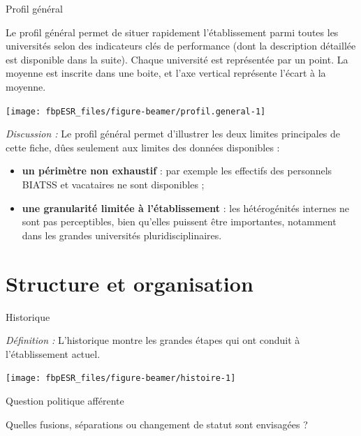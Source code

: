 \documentclass[
  8pt,
  french,
  ignorenonframetext,
  landscape]{beamer}
\providecommand{\tightlist}{%
  \setlength{\itemsep}{0pt}\setlength{\parskip}{0pt}}
\begin{document}
\begin{frame}{Profil général}
\protect\hypertarget{profil-guxe9nuxe9ral}{}

Le profil général permet de situer rapidement l'établissement parmi
toutes les universités selon des indicateurs clés de performance (dont
la description détaillée est disponible dans la suite). Chaque
université est représentée par un point. La moyenne est inscrite dans
une boite, et l'axe vertical représente l'écart à la moyenne.

\begin{center}\texttt{[image: fbpESR\_files/figure-beamer/profil.general-1]} \end{center}

\emph{Discussion :} Le profil général permet d'illustrer les deux
limites principales de cette fiche, dûes seulement aux limites des
données disponibles :

\begin{itemize}
\tightlist
\item
  \textbf{un périmètre non exhaustif} : par exemple les effectifs des
  personnels BIATSS et vacataires ne sont disponibles ;
\item
  \textbf{une granularité limitée à l'établissement} : les hétérogénités
  internes ne sont pas perceptibles, bien qu'elles puissent être
  importantes, notamment dans les grandes universités
  pluridisciplinaires.
\end{itemize}

\end{frame}

\hypertarget{structure-et-organisation}{%
\section{Structure et organisation}\label{structure-et-organisation}}

\begin{frame}{Historique}
\protect\hypertarget{historique}{}

\emph{Définition :} L'historique montre les grandes étapes qui ont
conduit à l'établissement actuel.

\begin{center}\texttt{[image: fbpESR\_files/figure-beamer/histoire-1]} \end{center}

\begin{block}{Question politique afférente}

Quelles fusions, séparations ou changement de statut sont envisagées ?

\end{block}

\end{frame}
\end{document}
